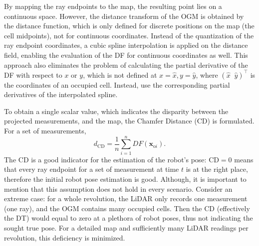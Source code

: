 By mapping the ray endpoints to the map, the resulting point lies
on a continuous space.
However, the distance transform of the OGM is obtained by
the distance function, which is only defined for discrete positions
on the map (the cell midpoints), not for continuous coordinates.
Instead of the quantization of the ray endpoint coordinates, a cubic spline
interpolation is applied on the distance field,
enabling the evaluation of the DF for continuous coordinates as well.
This approach also eliminates the problem of calculating the
partial derivative of the DF with respect to $x$ or $y$,
which is not defined at $x = \hat{x}, y = \hat{y}$, where
$(\hat{x}\;\; \hat{y})^{\top}$ is the coordinates of an occupied cell.
Instead, use the corresponding partial derivatives of the interpolated spline.


To obtain a single scalar value, which indicates the disparity between the projected measurements,
and the map, the Chamfer Distance (CD) is formulated. For a set of measurements,
\begin{equation}
    d_{\text{CD}} = \frac{1}{n}\sum_{i=1}^nDF(\mathbf{x}_{\text{o}i}).
\end{equation}
The CD is a good indicator for the estimation of the robot's pose: $\mathrm{CD}=0$ means
that every ray endpoint for a set of measurement at time $t$ is at the right place,
therefore the initial robot pose estimation is good.
Although, it is important to mention that this assumption does not hold in every
scenario. Consider an extreme case: for a whole revolution, the LiDAR only records
one measurement (one ray), and the OGM contains many occupied cells.
Then the CD (effectively the DT) would equal to zero at a plethora of robot poses, thus not indicating the sought true pose.
For a detailed map and sufficiently many LiDAR readings per revolution, this deficiency is minimized.

